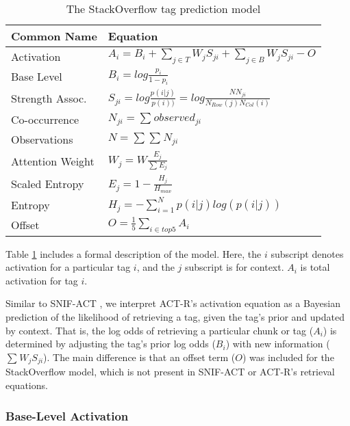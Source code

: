 \documentclass[10pt,letterpaper]{article}
\begin{document}
\renewcommand{\arraystretch}{1.5}
\renewcommand{\tabcolsep}{.5mm}
\begin{table}[!ht]
  \begin{center}
    \caption{The StackOverflow tag prediction model}
    \label{sample-table}
    \vskip 0.12in
    \begin{tabular}{ll}
      \hline
      Common Name &  Equation \\
      \hline
      Activation & 		$A_{i} = B_{i} + \sum_{j\in T}^{ } W_{j} S_{ji} + \sum_{j\in B}^{ } W_{j} S_{ji} - O$ \\
      Base Level & 		$B_{i} = log \frac{p_{i}}{1-p_{i}}$ \\
      Strength Assoc. &		$S_{ji} = log \frac{p(i|j)}{p(i))} = log \frac{NN_{ji}}{N_{Row}(j)N_{Col}(i)}$ \\
      Co-occurrence &		$N_{ji} = \sum_{}^{}{observed_{ji}}$ \\
      Observations &		$N = \sum_{}^{}{\sum_{}^{}{N_{ji}}}$ \\
      Attention Weight	& 	$W_{j} = W \frac{E_{j}} {\sum_{}^{} {E_{j}}} $ \\
      Scaled Entropy & 		$E_{j} = 1-\frac{H_{j}}{H_{max}}$ \\
      Entropy & 		$H_{j} = -\sum_{i=1}^{N}p(i|j)log\left (  p(i|j) \right )$ \\
      Offset & 			$O = \frac{1}{5}\sum_{i\in top 5}^{ } A_{i}$ \\
      \hline
    \end{tabular}
  \end{center}
\end{table}

Table \ref{sample-table} includes a formal description of the model.
Here, the $i$ subscript denotes activation for a particular tag $i$, and the $j$ subscript is for context.
$A_{i}$ is total activation for tag $i$.

Similar to SNIF-ACT \cite{Fu2007}, we interpret ACT-R's activation equation as a Bayesian prediction of the likelihood of retrieving a tag, given the tag's prior and updated by context.
That is, the log odds of retrieving a particular chunk or tag ($A_{i}$) is determined by adjusting the tag's prior log odds ($B_{i}$) with new information ($\sum_{}^{} W_{j} S_{ji}$).
The main difference is that an offset term ($O$) was included for the StackOverflow model, which is not present in SNIF-ACT or ACT-R's retrieval equations.

\subsubsection{Base-Level Activation}
\end{document}

